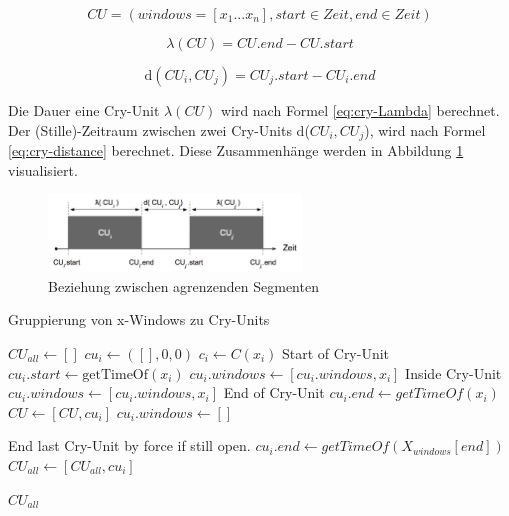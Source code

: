 \begin{equation}
CU = (windows = [x_1 ... x_n ], start \in Zeit, end \in Zeit)
\label{eq:cry-Unit}
\end{equation}

\begin{equation}
\lambda (CU) = CU.end - CU.start
\label{eq:cry-Lambda}
\end{equation}

\begin{equation}
\text{d}(CU_i, CU_j) = CU_j.start - CU_i.end
\label{eq:cry-distance}
\end{equation}

Die Dauer eine Cry-Unit $\lambda(CU)$ wird nach Formel \ref{eq:cry-Lambda} berechnet. Der (Stille)-Zeitraum zwischen zwei Cry-Units d($CU_i, CU_j$), wird nach Formel \ref{eq:cry-distance} berechnet. Diese Zusammenhänge werden in Abbildung \ref{img:cryUnit-details} visualisiert.\cite{vad_entropy}

\begin{figure}[h]
	\centering
	\includegraphics[width=0.6\textwidth]{bilder/newSmoothing03.png}
	\caption{Beziehung zwischen agrenzenden Segmenten}
	\label{img:cryUnit-details}
\end{figure}

\begin{algorithm}[H]
	\caption{Gruppierung von x-Windows zu Cry-Units}
	\label{alg:cryUnit}
	\begin{algorithmic}[1]
		\State $ CU_{all} \gets []$
		\State $ cu_i \gets ([],0,0)$
		\State $ c_i \gets C(x_i)$
		\State \Comment Start of Cry-Unit
		\State $cu_i.start \gets \text{getTimeOf}(x_i)$
		\State $cu_i.windows \gets [cu_i.windows, x_i]$
		\EndIf
		\State \Comment Inside Cry-Unit
		\State $cu_i.windows \gets [cu_i.windows, x_i]$
		\EndIf
		\State \Comment End of Cry-Unit
		\State $cu_i.end \gets  getTimeOf(x_i)$
		\State $CU \gets [CU, cu_i]$
		\State $cu_i.windows \gets []$
		\EndIf
		\EndFor
		
		\State \Comment End last Cry-Unit by force if still open.
		\State $cu_i.end \gets  getTimeOf(X_{windows}[end])$
		\State $CU_{all} \gets [CU_{all}, cu_i]$
		\EndIf
		
		\Return $CU_{all}$
		
		\EndFunction
		
	\end{algorithmic}
\end{algorithm}

